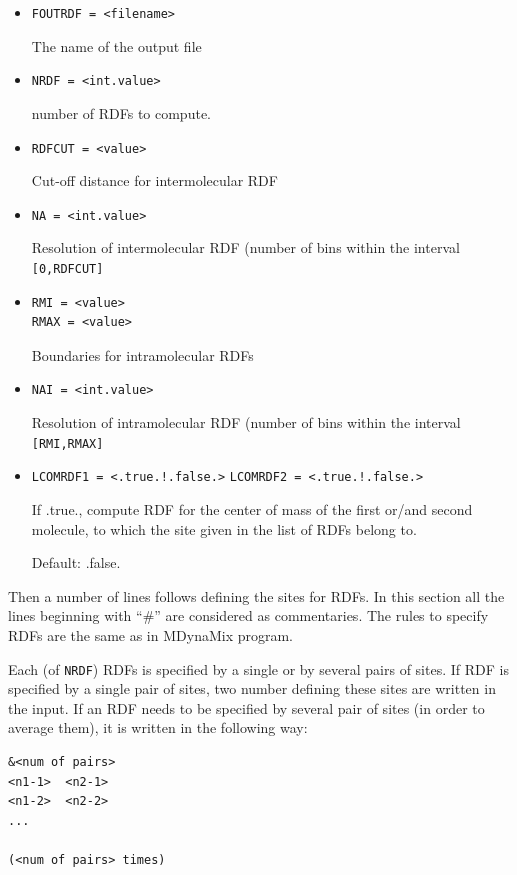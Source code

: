 \documentclass{article}
\begin{document}
\begin{itemize}

\item
\verb|FOUTRDF = <filename>|

The name of the output file

\item
\verb|NRDF = <int.value>|

number of RDFs to compute.

\item
\verb|RDFCUT = <value>|

Cut-off distance for intermolecular RDF

\item
\verb|NA = <int.value>|

Resolution of intermolecular RDF (number of bins within the 
interval \verb|[0,RDFCUT]|

\item
\begin{verbatim}
RMI = <value>
RMAX = <value>
\end{verbatim}

Boundaries for intramolecular RDFs

\item
\verb|NAI = <int.value>|

Resolution of intramolecular RDF (number of bins within the 
interval \verb|[RMI,RMAX]|

\item
\verb|LCOMRDF1 = <.true.!.false.>|
\verb|LCOMRDF2 = <.true.!.false.>|

If .true., compute RDF for the center of mass of the first or/and second 
molecule, to which the site given in the list of RDFs belong to.

Default:  .false.

\end{itemize}

Then a number of lines follows defining the sites for RDFs. In this section 
all the lines beginning with ``\#'' are considered as commentaries. The
rules to specify RDFs are the same as in MDynaMix program.

Each (of \verb|NRDF|) RDFs is specified by a single or by several pairs of
sites. If RDF is specified by a single pair of sites, two number defining
these sites are written in the input. If an RDF needs to be specified by 
several pair of sites (in order to average them), it is written in the 
following way:

\begin{verbatim} 
&<num of pairs>
<n1-1>  <n2-1>
<n1-2>  <n2-2>
...
 
(<num of pairs> times)
\end{verbatim}
\end{document}
